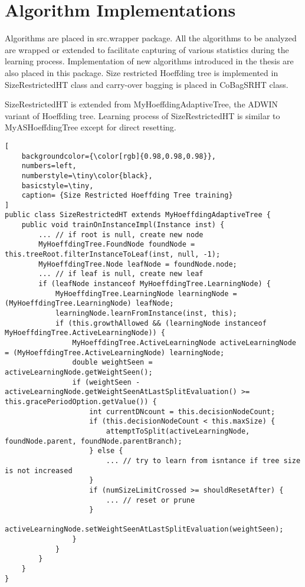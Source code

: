 \section*{Algorithm Implementations}
Algorithms are placed in src.wrapper package. All the algorithms to be analyzed are wrapped or extended to facilitate capturing of various statistics during the learning process. Implementation of new algorithms introduced in the thesis are also placed in this package. Size restricted Hoeffding tree is implemented in SizeRestrictedHT class and carry-over bagging is placed in CoBagSRHT class. 

SizeRestrictedHT is extended from MyHoeffdingAdaptiveTree, the ADWIN variant of Hoeffding tree. Learning process of SizeRestrictedHT is similar to MyASHoeffdingTree except for direct resetting.
\begin{lstlisting}[
    backgroundcolor={\color[rgb]{0.98,0.98,0.98}},
    numbers=left,
    numberstyle=\tiny\color{black},
    basicstyle=\tiny,
    caption= {Size Restricted Hoeffding Tree training}
]
public class SizeRestrictedHT extends MyHoeffdingAdaptiveTree {
    public void trainOnInstanceImpl(Instance inst) {
        ... // if root is null, create new node
        MyHoeffdingTree.FoundNode foundNode = this.treeRoot.filterInstanceToLeaf(inst, null, -1);
        MyHoeffdingTree.Node leafNode = foundNode.node;
        ... // if leaf is null, create new leaf
        if (leafNode instanceof MyHoeffdingTree.LearningNode) {
            MyHoeffdingTree.LearningNode learningNode = (MyHoeffdingTree.LearningNode) leafNode;
            learningNode.learnFromInstance(inst, this);
            if (this.growthAllowed && (learningNode instanceof MyHoeffdingTree.ActiveLearningNode)) {
                MyHoeffdingTree.ActiveLearningNode activeLearningNode = (MyHoeffdingTree.ActiveLearningNode) learningNode;
                double weightSeen = activeLearningNode.getWeightSeen();
                if (weightSeen - activeLearningNode.getWeightSeenAtLastSplitEvaluation() >= this.gracePeriodOption.getValue()) {
                    int currentDNcount = this.decisionNodeCount;
                    if (this.decisionNodeCount < this.maxSize) {
                        attemptToSplit(activeLearningNode, foundNode.parent, foundNode.parentBranch);
                    } else {
                        ... // try to learn from isntance if tree size is not increased
                    }
                    if (numSizeLimitCrossed >= shouldResetAfter) {
                        ... // reset or prune
                    }
                    activeLearningNode.setWeightSeenAtLastSplitEvaluation(weightSeen);
                }
            }
        }
    }
}
\end{lstlisting}
